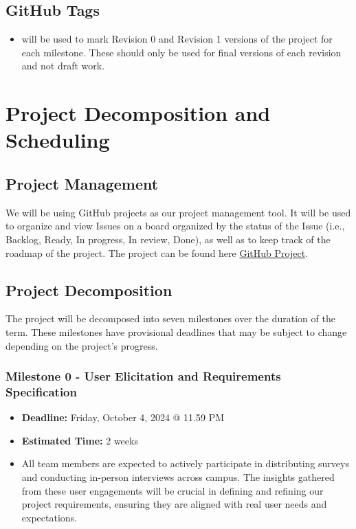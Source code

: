 \documentclass{article}
\begin{document}
\subsection{GitHub Tags}
\begin{itemize}
    \item will be used to mark Revision 0 and Revision 1 versions of the project for each milestone. These should only be used for final versions of each revision and not draft work.
\end{itemize}

\newpage

\section{Project Decomposition and Scheduling}

\subsection{Project Management}
We will be using GitHub projects as our project management tool. It will be used to organize and view Issues on a board organized by the status of the Issue (i.e., Backlog, Ready, In progress, In review, Done), as well as to keep track of the roadmap of the project. The project can be found here \href{https://github.com/orgs/PlutosCapstone/projects/1/views/1}{GitHub Project}.

\subsection{Project Decomposition}
The project will be decomposed into seven milestones over the duration of the term. These milestones have provisional deadlines that may be subject to change depending on the project's progress.

\subsubsection*{Milestone 0 - User Elicitation and Requirements Specification}
\begin{itemize}
    \item \textbf{Deadline:} Friday, October 4, 2024 @ 11.59 PM
    \item \textbf{Estimated Time:} 2 weeks
    \item All team members are expected to actively participate in distributing surveys and conducting in-person interviews across campus. The insights gathered from these user engagements will be crucial in defining and refining our project requirements, ensuring they are aligned with real user needs and expectations.
\end{itemize}
\end{document}
